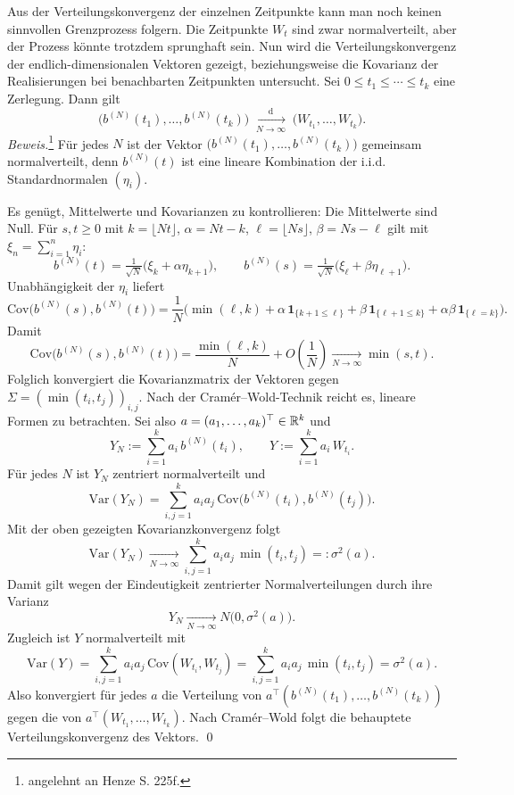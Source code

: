 \begin{satz}
Aus der Verteilungskonvergenz der einzelnen Zeitpunkte kann man noch keinen sinnvollen Grenzprozess folgern.
Die Zeitpunkte $W_t$ sind zwar normalverteilt, aber der Prozess könnte trotzdem sprunghaft sein.
Nun wird die Verteilungskonvergenz der endlich-dimensionalen Vektoren gezeigt, beziehungsweise
die Kovarianz der Realisierungen bei benachbarten Zeitpunkten untersucht.
Sei $0\le t_1\le\cdots\le t_k$ eine Zerlegung. Dann gilt
$$
\big(b^{(N)}(t_1), \dots , b^{(N)}(t_k) \big )\;\xrightarrow[N \to \infty]{\mathrm{d}}\;\big(W_{t_1},\dots,W_{t_k}\big).
$$
\textit{Beweis.}\footnote{angelehnt an Henze \cite{henze} S. 225f.}
Für jedes $N$ ist der Vektor $\big(b^{(N)}(t_1),\dots,b^{(N)}(t_k)\big)$ gemeinsam normalverteilt,
denn $b^{(N)}(t)$ ist eine lineare Kombination der i.i.d. Standardnormalen $(\eta_i)$.

Es genügt, Mittelwerte und Kovarianzen zu kontrollieren:
Die Mittelwerte sind Null. Für $s,t\ge0$ mit $k=\lfloor Nt\rfloor$, $\alpha=Nt-k$, 
$\ell=\lfloor Ns\rfloor$, $\beta=Ns-\ell$ gilt mit $\xi_n=\sum_{i=1}^n\eta_i$:
$$
b^{(N)}(t)=\tfrac1{\sqrt N}\big(\xi_k+\alpha\eta_{k+1}\big),\qquad
b^{(N)}(s)=\tfrac1{\sqrt N}\big(\xi_\ell+\beta\eta_{\ell+1}\big).
$$
Unabhängigkeit der $\eta_i$ liefert
$$
\mathrm{Cov}\!\big(b^{(N)}(s),b^{(N)}(t)\big)
=\frac1N\Big(\min(\ell,k)+\alpha\,\mathbf 1_{\{k+1\le \ell\}}+\beta\,\mathbf 1_{\{\ell+1\le k\}}+\alpha\beta\,\mathbf 1_{\{\ell=k\}}\Big).
$$
Damit
$$
\mathrm{Cov}\!\big(b^{(N)}(s),b^{(N)}(t)\big)
=\frac{\min(\ell,k)}{N}+O\!\left(\frac1N\right)\xrightarrow[N\to\infty]{}\min(s,t).
$$
Folglich konvergiert die Kovarianzmatrix der Vektoren gegen 
$\Sigma=(\min(t_i,t_j))_{i,j}$.
Nach der Cramér–Wold-Technik reicht es, lineare Formen zu betrachten. Sei also $a=(a_1,\dots,a_k)^\top\in\Bbb R^k$ und
$$
Y_N:=\sum_{i=1}^k a_i\,b^{(N)}(t_i),\qquad
Y:=\sum_{i=1}^k a_i\,W_{t_i}.
$$
Für jedes $N$ ist $Y_N$ zentriert normalverteilt und
$$
\mathrm{Var}(Y_N)=\sum_{i,j=1}^k a_i a_j\,\mathrm{Cov}\!\big(b^{(N)}(t_i),b^{(N)}(t_j)\big).
$$
Mit der oben gezeigten Kovarianzkonvergenz folgt
$$
\mathrm{Var}(Y_N)\xrightarrow[N\to\infty]{}\sum_{i,j=1}^k a_i a_j\,\min(t_i,t_j)=:\sigma^2(a).
$$
Damit gilt wegen der Eindeutigkeit zentrierter Normalverteilungen durch ihre Varianz
$$
Y_N \xrightarrow[N\to\infty]{} N\!\big(0,\sigma^2(a)\big).
$$
Zugleich ist $Y$ normalverteilt mit
$$
\mathrm{Var}(Y)=\sum_{i,j=1}^k a_i a_j\,\mathrm{Cov}(W_{t_i},W_{t_j})
=\sum_{i,j=1}^k a_i a_j\,\min(t_i,t_j)=\sigma^2(a).
$$
Also konvergiert für jedes $a$ die Verteilung von $a^\top(b^{(N)}(t_1),\dots,b^{(N)}(t_k))$ gegen die von $a^\top(W_{t_1},\dots,W_{t_k})$.
Nach Cramér–Wold folgt die behauptete Verteilungskonvergenz des Vektors. \qed
\end{satz}

